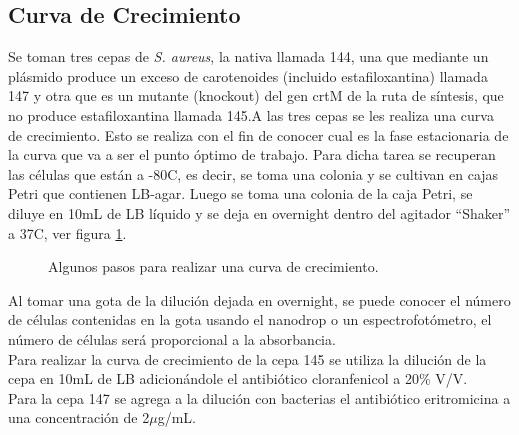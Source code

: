 \documentclass[%
 reprint,
 amsmath,amssymb,
 aps,
]{revtex4-1}
\begin{document}
\subsection{Curva de Crecimiento}
Se toman tres cepas de \textit{S. aureus}, la nativa llamada 144, una que mediante un plásmido produce un exceso de carotenoides (incluido estafiloxantina) llamada 147 y otra que es un mutante (knockout) del gen crtM de la ruta de síntesis, que no produce estafiloxantina llamada 145.A las tres cepas se les realiza una curva de crecimiento.  Esto se realiza con el fin de conocer cual es la fase estacionaria de la curva que va a ser el punto óptimo de trabajo. Para dicha tarea se recuperan las células que están a -80\textdegree C, es decir, se toma una colonia y se cultivan en cajas Petri que contienen LB-agar. Luego se toma una colonia de la caja Petri, se diluye en 10mL de LB líquido y se deja en overnight dentro del agitador ``Shaker'' a  37\textdegree C, ver figura \ref{fig:curv1}.\\
\begin{figure}
 
  \caption{Algunos pasos para realizar una curva de crecimiento.}
  \label{fig:curv1}
\end{figure}
 Al tomar una gota de la dilución dejada en overnight, se puede conocer el número de células contenidas en la gota usando el nanodrop o un espectrofotómetro, el número de células será proporcional a la absorbancia.\\
 Para realizar la curva de crecimiento de la cepa 145 se utiliza la dilución de la cepa en 10mL de LB adicionándole el antibiótico cloranfenicol a 20\% V/V.\\
 Para la cepa 147 se agrega a la dilución con bacterias el antibiótico eritromicina a una concentración  de 2$\mu$g/mL.
\end{document}
